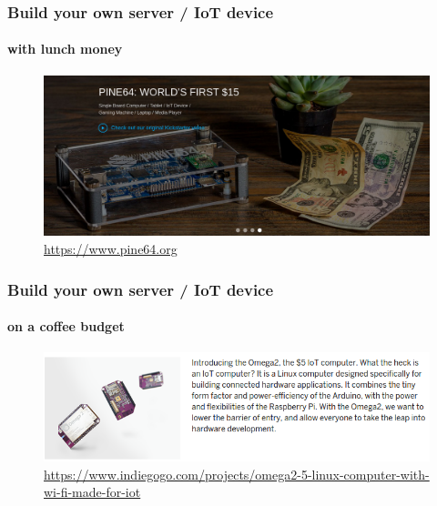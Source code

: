 \documentclass{beamer}
\begin{document}
	\begin{frame}
	\frametitle{Build your own server / IoT device}
	\framesubtitle{with lunch money}
	        \begin{figure}[h]
                \centering
                \includegraphics[width=.8\textwidth]{./images/pine64}
		\caption{\url{https://www.pine64.org}}
        	\end{figure}
	\end{frame}

	\begin{frame}
	\frametitle{Build your own server / IoT device}
	\framesubtitle{on a coffee budget}
	        \begin{figure}[h]
                \centering
                \includegraphics[width=.8\textwidth]{./images/Omega2}
		\caption{\tiny{\url{https://www.indiegogo.com/projects/omega2-5-linux-computer-with-wi-fi-made-for-iot}}}
        	\end{figure}
	\end{frame}
\end{document}
